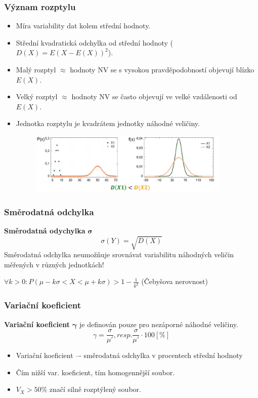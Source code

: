 \subsubsection{Význam rozptylu}
\begin{itemize}
	\item Míra variability dat kolem střední hodnoty.
	\item Střední kvadratická odchylka od střední hodnoty ($D(X) = E(X - E(X))^2$).
	\item Malý rozptyl $\approx$ hodnoty NV se s vysokou pravděpodobností objevují blízko $E(X)$.
	\item Velký rozptyl $\approx$ hodnoty NV se často objevují ve velké vzdálenosti od $E(X)$.
	\item Jednotka rozptylu je kvadrátem jednotky náhodné veličiny.
	\begin{figure}[H]
			\centering
			\includegraphics[width=0.9\textwidth]{assets/11_rozptyl}
	\end{figure}
\end{itemize}

\subsubsection{Směrodatná odchylka}
\textbf{Směrodatná odychylka} $\mathbf{\sigma}$ $$\sigma(Y) = \sqrt{D(X)}$$
Směrodatná odchylka neumožňuje srovnávat variabilitu náhodných veličin měřených v různých jednotkách! 
\begin{center}
 $\forall k >0 \colon P (\mu - k\sigma < X < \mu + k\sigma) > 1 - \frac{1}{k^2}$ (Čebyšova nerovnost)
 \end{center}
\subsubsection{Variační koeficient}
\textbf{Variační koeficient} $\mathbf{\gamma}$ je definován pouze pro nezáporné náhodné veličiny. $$\gamma = \frac{\sigma}{\mu'}, resp. \frac{\sigma}{\mu'} \cdot 100 [\%]$$
\begin{itemize}
	\item Variační koeficient –- směrodatná odchylka v procentech střední hodnoty
	\item Čím nižší var. koeficient, tím homogennější soubor.
	\item $V_X > 50\%$ značí silně rozptýlený soubor.
\end{itemize}